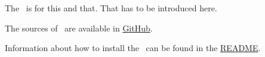 %



%

The \pkg\ is for this and that. That has to be introduced here.

The sources of \pkg\ are available in \href{https://github.com/test-fullautomation/vscode-welcome}{GitHub}.

Information about how to install the \pkg\ can be found in the \href{https://github.com/test-fullautomation/vscode-welcome/blob/develop/README.rst}{README}.

